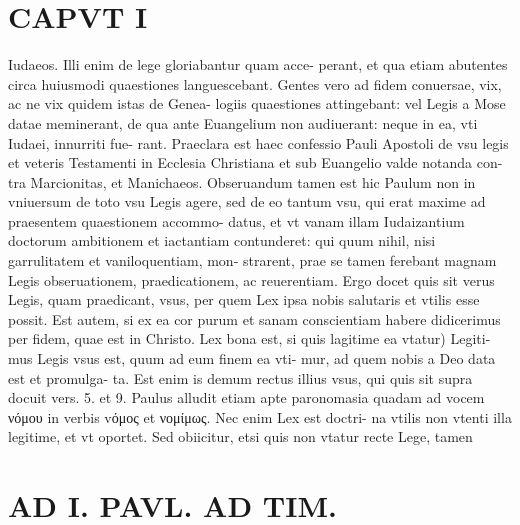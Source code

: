 \documentclass{article}
\begin{document}
\begin{pages}
\section*{CAPVT  I }
\marginpar{[ p.19 ]}\pstart Iudaeos. Illi enim de lege gloriabantur quam acce- perant, et qua etiam abutentes circa huiusmodi quaestiones languescebant. Gentes vero ad fidem conuersae, vix, ac ne vix quidem istas de Genea- logiis quaestiones attingebant: vel Legis a Mose datae meminerant, de qua ante Euangelium non audiuerant: neque in ea, vti Iudaei, innurriti fue- rant. Praeclara est haec confessio Pauli Apostoli de vsu legis et veteris Testamenti in Ecclesia Christiana et sub Euangelio valde notanda con- tra Marcionitas, et Manichaeos. Obseruandum tamen est hic Paulum non in vniuersum de toto vsu Legis agere, sed de eo tantum vsu, qui erat maxime ad praesentem quaestionem accommo- datus, et vt vanam illam Iudaizantium doctorum ambitionem et iactantiam contunderet: qui quum nihil, nisi garrulitatem et vaniloquentiam, mon- strarent, prae se tamen ferebant magnam Legis obseruationem, praedicationem, ac reuerentiam. Ergo docet quis sit verus Legis, quam praedicant, vsus, per quem Lex ipsa nobis salutaris et vtilis esse possit. Est autem, si ex ea cor purum et sanam conscientiam habere didicerimus per fidem, quae est in Christo. Lex bona est, si quis lagitime ea vtatur) Legiti- mus Legis vsus est, quum ad eum finem ea vti- mur, ad quem nobis a Deo data est et promulga- ta. Est enim is demum rectus illius vsus, qui quis sit supra docuit vers. 5. et 9. Paulus alludit etiam apte paronomasia quadam ad vocem νόμου in verbis vόμος et νομίμως. Nec enim Lex est doctri- na vtilis non vtenti illa legitime, et vt oportet. Sed obiicitur, etsi quis non vtatur recte Lege, tamen  \pend
\section*{AD I. PAVL. AD TIM. }
\marginpar{[ p.20 ]}\pstart {}
{}

\end{pages}
\end{document}
